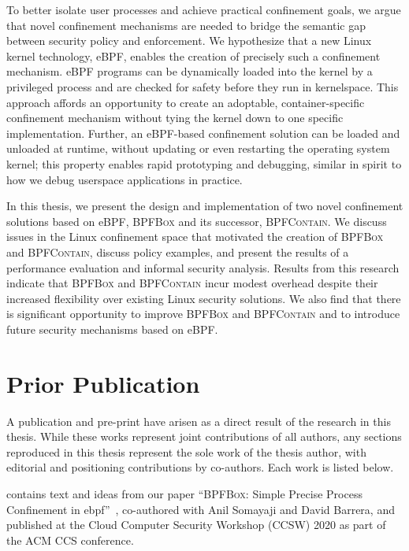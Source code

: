 \documentclass[
  fontsize=12pt,
  titlepage=firstiscover,
  paper=letter,
oneside,
  cleardoublepage=plain,
  parskip=half-,
  DIV=10,
  parindent,
  appendixprefix,
  chapterprefix,
  listof=totoc,
]{scrbook}
\newcommand{\bpfbox}{\textsc{BPFBox}}
\newcommand{\bpfcontain}{\textsc{BPFContain}}
\begin{document}
To better isolate user processes and achieve practical confinement goals, we argue that
novel confinement mechanisms are needed to bridge the semantic gap between security policy
and enforcement. We hypothesize that a new Linux kernel technology, eBPF, enables the
creation of precisely such a confinement mechanism. eBPF programs can be dynamically
loaded into the kernel by a privileged process and are checked for safety before they run
in kernelspace.  This approach affords an opportunity to create an adoptable,
container-specific confinement mechanism without tying the kernel down to one specific
implementation.  Further, an eBPF-based confinement solution can be loaded and unloaded at
runtime, without updating or even restarting the operating system kernel; this property
enables rapid prototyping and debugging, similar in spirit to how we debug userspace
applications in practice.

In this thesis, we present the design and implementation of two novel confinement
solutions based on eBPF, \bpfbox{} and its successor, \bpfcontain{}. We discuss issues in
the Linux confinement space that motivated the creation of \bpfbox{} and \bpfcontain{},
discuss policy examples, and present the results of a performance evaluation and informal
security analysis. Results from this research indicate that \bpfbox{} and \bpfcontain{}
incur modest overhead despite their increased flexibility over existing Linux security
solutions.  We also find that there is significant opportunity to improve \bpfbox{} and
\bpfcontain{} and to introduce future security mechanisms based on eBPF\@.

\endgroup
\cleardoublepage









\chapter*{Prior Publication}\begingroup
\small
A publication and pre-print have arisen as a direct result of the research in this thesis.
While these works represent joint contributions of all authors, any sections reproduced in
this thesis represent the sole work of the thesis author, with editorial and positioning
contributions by co-authors. Each work is listed below.

 contains text and ideas from our paper \enquote{\bpfbox{}: Simple Precise
Process Confinement in \gls{ebpf}}~\cite{findlay2020_bpfbox}, co-authored with Anil
Somayaji and David Barrera, and published at the Cloud Computer Security Workshop (CCSW)
2020 as part of the ACM CCS conference.
\end{document}
